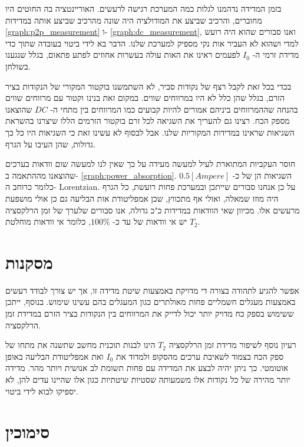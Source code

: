 \documentclass{article}
\begin{document}
בזמן המדידה נדהמנו לגלות כמה המערכת רגישה לרעשים. האוריינטציה בה החוטים היו מחוברים, והרכיב שביצע את המודולציה היה שונה מהרכיב שביצע אותה במדידות
\ref{graph:p2p_measurement}
ו-
\ref{graph:dc_measurement},
ואנו סבורים שהוא היה רועש למדי ושהוא לא העביר אות נקי מספיק למערכת שלנו. הדבר בא לידי ביטוי בעובדה שתוך כדי מדידת זרמי ה-
$I_0$
לפעמים ראינו את האות עולה בעשרות אחוזים לפתע פתאום, בגלל שנגענו בשולחן.

בכדי בכל זאת לקבל רצף של נקודות סביר, לא השתמשנו בוקטור המקורי של הנקודות בציר הזרם, בגלל שהן כלל לא היו במרווחים שווים. במקום זאת בנינו וקטור עם מרווחים שווים בהנחה שההמרווחים ביניהם אמורים להיות קבועים כמו המרווחים בין מתחי ה-
$DC$
שהוצאנו מספק הכח. רצינו גם להעריך את השגיאה לכל זרם בוקטור הזרמים הללו שיצרנו בהשראת השגיאות שראינו במדידות המקוריות שלנו. אבל לבסוף לא עשינו זאת כי השגיאות היו כל כך גדולות, שהן העיבו על הגרף.

חוסר העקביות המתוארת לעיל למעשה מעידה על כך שאין לנו למעשה שום וודאות בערכים שהוצאנו מההתאמה ב-
\ref{graph:power_absorption}.
השגיאות הן של כ-
$0.5 [Ampere]$
כלומר כרוחב ה-
\textenglish{Lorentzian}.
על כן אנחנו סבורים שייתכן ובמערכת פחות רועשת, כל הגרף היה מוזז שמאלה, ואולי אף מתכווץ, שכן אמפליטודת אות הבליעה גם כן אולי מושפעת מרעשים אלו. מכיוון שאי הוודאות במדידות כ"כ גדולה, אנו סבורים שלערך של זמן הרלקסציה
$T_2$
יש אי וודאות של עד כ-
$100\%$,
כלומר אי וודאות מוחלטת.

\section{
מסקנות
}

אפשר להגיע לתהודה בצורה די מדויקת באמצעות שיטת מדידה זו, אך יש צורך לבודד רעשים באמצעות מעגלים חשמליים פחות מאולתרים כגון המעגלים בהם עשינו שימוש. בנוסף, ייתכן ששימוש בספק כח מדויק יותר יכול לדייק את המרווחים בין הנקודות בציר הזרם במדידת זמן הרלקסציה.

רעיון נוסף לשיפור מדידת זמן הרלקסציה 
$T_2$
הינו לבנות תוכנית מחשב שתשנה את מתחו של ספק הכח בצמוד לשאיבת ערכים מהסקופ ולמדוד את
$I_0$
ואת אמפליטודת הבליעה באופן אוטומטי. כך ניתן יהיה לבצע את המדידה עם פחות תשומת לב אנושית ויותר מהר. מדידה יותר מהירה של כל נקודות אלו משמעותה שסטיות שיטתיות כגון אלו שהיינו עדים להן, לא יספיקו לבוא לידי ביטוי.

\section*{
סימוכין
}

\begin{english}
\printbibliography[heading=none]
\end{english}
\end{document}
